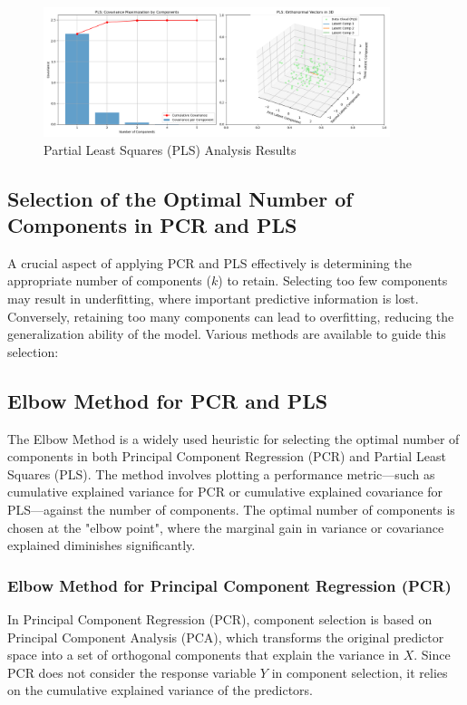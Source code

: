 \documentclass[11pt,twoside,a4paper]{article}
\begin{document}
\begin{figure}[H]
    \centering
    \includegraphics[width=0.9\textwidth]{PLS_Selected_Analysis.png}
    \caption{Partial Least Squares (PLS) Analysis Results}
    \label{fig:PLS_analysis}
\end{figure}



\subsection{Selection of the Optimal Number of Components in PCR and PLS}
A crucial aspect of applying PCR and PLS effectively is determining the appropriate number of components (\( k \)) to retain. Selecting too few components may result in underfitting, where important predictive information is lost. Conversely, retaining too many components can lead to overfitting, reducing the generalization ability of the model. Various methods are available to guide this selection:
\subsection{Elbow Method for PCR and PLS}
The Elbow Method is a widely used heuristic for selecting the optimal number of components in both Principal Component Regression (PCR) and Partial Least Squares (PLS). The method involves plotting a performance metric—such as cumulative explained variance for PCR or cumulative explained covariance for PLS—against the number of components. The optimal number of components is chosen at the "elbow point", where the marginal gain in variance or covariance explained diminishes significantly.

\subsubsection{Elbow Method for Principal Component Regression (PCR)}
In Principal Component Regression (PCR), component selection is based on Principal Component Analysis (PCA), which transforms the original predictor space into a set of orthogonal components that explain the variance in \( X \). Since PCR does not consider the response variable \( Y \) in component selection, it relies on the cumulative explained variance of the predictors.
\end{document}
